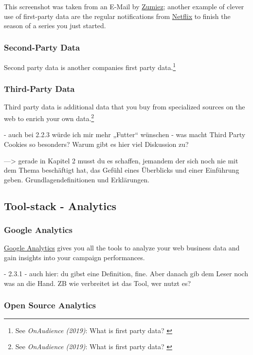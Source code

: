 This screenshot was taken from an E-Mail by \href{https://www.zumiez.com/}{Zumiez}; another example of clever use of first-party data are the regular notifications from \href{https://www.netflix.com/de-en/}{Netflix} to finish the season of a series you just started.

\subsubsection{Second-Party Data}

Second party data is another companies first party data.\footnote{See \textit{OnAudience (2019)}: What is first party data? \cite{firstParty}}

\subsubsection{Third-Party Data}

Third party data is additional data that you buy from specialized sources on the web to enrich your own data.\footnote{See \textit{OnAudience (2019)}: What is first party data? \cite{firstParty}}

- auch bei 2.2.3 würde ich mir mehr „Futter“ wünschen - was macht Third Party Cookies so besonders? Warum gibt es hier viel Diskussion zu?

—> gerade in Kapitel 2 musst du es schaffen, jemandem der sich noch nie mit dem Thema beschäftigt hat, das Gefühl eines Überblicks und einer Einführung geben. Grundlagendefinitionen und Erklärungen.

\subsection{Tool-stack - Analytics}

\subsubsection{Google Analytics}

\href{https://analytics.google.com/}{Google Analytics} gives you all the tools to analyze your web business data and gain insights into your campaign performances.

- 2.3.1 - auch hier: du gibst eine Definition, fine. Aber danach gib dem Leser noch was an die Hand. ZB wie verbreitet ist das Tool, wer nutzt es?

\subsubsection{Open Source Analytics}


